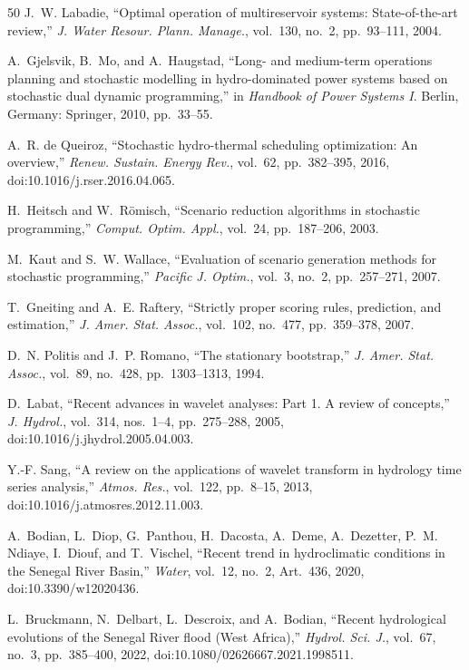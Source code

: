 \documentclass[11pt,a4paper]{article}
\begin{document}
\begin{thebibliography}{50}
 J.~W. Labadie, ``Optimal operation of multireservoir
systems: State-of-the-art review,'' \emph{J. Water Resour. Plann. Manage.},
vol.~130, no.~2, pp.~93--111, 2004.

 A.~Gjelsvik, B.~Mo, and A.~Haugstad, ``Long- and
medium-term operations planning and stochastic modelling in hydro-dominated
power systems based on stochastic dual dynamic programming,'' in \emph{Handbook
of Power Systems I}. Berlin, Germany: Springer, 2010, pp.~33--55.

 A.~R. de Queiroz, ``Stochastic hydro-thermal
scheduling optimization: An overview,'' \emph{Renew. Sustain. Energy Rev.},
vol.~62, pp.~382--395, 2016, doi:10.1016/j.rser.2016.04.065.

 H.~Heitsch and W.~R\"omisch, ``Scenario reduction
algorithms in stochastic programming,'' \emph{Comput. Optim. Appl.}, vol.~24,
pp.~187--206, 2003.

 M.~Kaut and S.~W. Wallace, ``Evaluation of scenario generation
methods for stochastic programming,'' \emph{Pacific J. Optim.}, vol.~3, no.~2,
pp.~257--271, 2007.

 T.~Gneiting and A.~E. Raftery, ``Strictly proper scoring
rules, prediction, and estimation,'' \emph{J. Amer. Stat. Assoc.}, vol.~102,
no.~477, pp.~359--378, 2007.

 D.~N. Politis and J.~P. Romano, ``The stationary
bootstrap,'' \emph{J. Amer. Stat. Assoc.}, vol.~89, no.~428, pp.~1303--1313,
1994.

 D.~Labat, ``Recent advances in wavelet analyses:
Part 1. A review of concepts,'' \emph{J. Hydrol.}, vol.~314, nos.~1--4,
pp.~275--288, 2005, doi:10.1016/j.jhydrol.2005.04.003.

 Y.-F. Sang, ``A review on the applications of
wavelet transform in hydrology time series analysis,'' \emph{Atmos. Res.},
vol.~122, pp.~8--15, 2013, doi:10.1016/j.atmosres.2012.11.003.

 A.~Bodian, L.~Diop, G.~Panthou, H.~Dacosta,
A.~Deme, A.~Dezetter, P.~M. Ndiaye, I.~Diouf, and T.~Vischel, ``Recent trend
in hydroclimatic conditions in the Senegal River Basin,'' \emph{Water}, vol.~12,
no.~2, Art.~436, 2020, doi:10.3390/w12020436.

 L.~Bruckmann, N.~Delbart, L.~Descroix,
and A.~Bodian, ``Recent hydrological evolutions of the Senegal River flood
(West Africa),'' \emph{Hydrol. Sci. J.}, vol.~67, no.~3, pp.~385--400, 2022,
doi:10.1080/02626667.2021.1998511.


\end{thebibliography}
\end{document}
